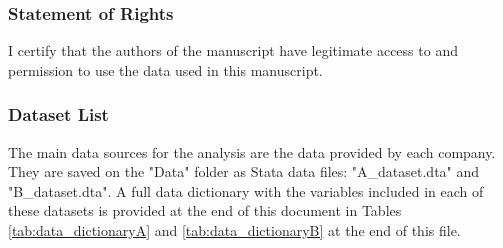 \documentclass[
]{article}
\begin{document}
\subsubsection{Statement of Rights}
I certify that the authors of the manuscript have legitimate access to and permission to use the data used in this manuscript.


\subsubsection{Dataset List}

The main data sources for the analysis are the data provided by each company. They are saved on the "Data" folder as Stata data files: "A\_dataset.dta" and "B\_dataset.dta". A full data dictionary with the variables included in each of these datasets is provided at the end of this document in Tables \ref{tab:data_dictionaryA} and \ref{tab:data_dictionaryB} at the end of this file.
\end{document}
